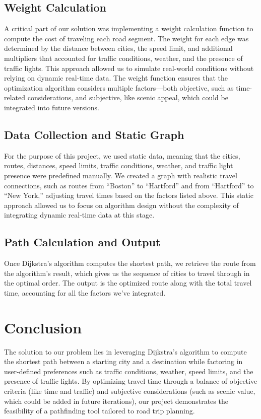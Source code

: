 \documentclass{article}
\begin{document}
\subsection{Weight Calculation}
A critical part of our solution was implementing a weight calculation function to compute the cost of traveling each road segment. The weight for each edge was determined by the distance between cities, the speed limit, and additional multipliers that accounted for traffic conditions, weather, and the presence of traffic lights. This approach allowed us to simulate real-world conditions without relying on dynamic real-time data. The weight function ensures that the optimization algorithm considers multiple factors—both objective, such as time-related considerations, and subjective, like scenic appeal, which could be integrated into future versions.

\subsection{Data Collection and Static Graph}
For the purpose of this project, we used static data, meaning that the cities, routes, distances, speed limits, traffic conditions, weather, and traffic light presence were predefined manually. We created a graph with realistic travel connections, such as routes from “Boston” to “Hartford” and from “Hartford” to “New York,” adjusting travel times based on the factors listed above. This static approach allowed us to focus on algorithm design without the complexity of integrating dynamic real-time data at this stage.

\subsection{Path Calculation and Output}
Once Dijkstra's algorithm computes the shortest path, we retrieve the route from the algorithm’s result, which gives us the sequence of cities to travel through in the optimal order. The output is the optimized route along with the total travel time, accounting for all the factors we've integrated.
\newpage
\section{Conclusion}

The solution to our problem lies in leveraging Dijkstra’s algorithm to compute the shortest path between a starting city and a destination while factoring in user-defined preferences such as traffic conditions, weather, speed limits, and the presence of traffic lights. By optimizing travel time through a balance of objective criteria (like time and traffic) and subjective considerations (such as scenic value, which could be added in future iterations), our project demonstrates the feasibility of a pathfinding tool tailored to road trip planning.
\end{document}
